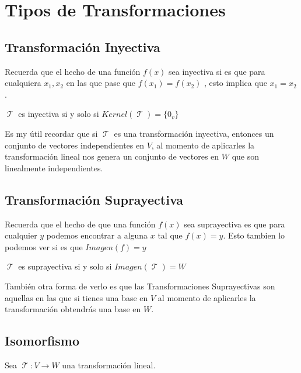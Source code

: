 \documentclass[12pt]{report}                                    %
\DeclareMathOperator \LinealTransformation {\mathcal{T}}        %
\DeclareMathOperator \LT {\mathcal{T}}                          %
\begin{document}
\chapter{Tipos de Transformaciones}

    \clearpage

    \section{Transformación Inyectiva}
        Recuerda que el hecho de una función $f(x)$ sea inyectiva si es que para cualquiera $x_1, x_2$
        en las que pase que $f(x_1) = f(x_2)$ , esto implica que $x_1 = x_2$.

        $\LinealTransformation$ es inyectiva si y solo si $Kernel(\LinealTransformation) = \{0_v\}$

        Es my útil recordar que si $\LT$ es una transformación inyectiva, entonces un conjunto
        de vectores independientes en $V$, al momento de aplicarles la transformación lineal
        nos genera un conjunto de vectores en $W$ que son linealmente independientes.

    \section{Transformación Suprayectiva}
        Recuerda que el hecho de que una función $f(x)$ sea suprayectiva es que para cualquier
        $y$ podemos encontrar a alguna $x$ tal que $f(x)=y$. Esto tambien lo podemos ver si es que $Imagen(f)= y$

        $\LinealTransformation$ es suprayectiva si y solo si $Imagen(\LT) = W$

        También otra forma de verlo es que las Transformaciones Suprayectivas son aquellas en las que si
        tienes una base en $V$ al momento de aplicarles la transformación obtendrás una base en $W$.


    \clearpage
    \section{Isomorfismo}
        Sea $\LinealTransformation : V \to W $ una transformación lineal.
\end{document}
